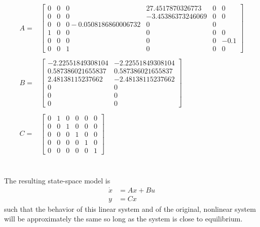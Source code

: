 \documentclass[12pt]{article}
\begin{document}
\begin{equation}
\begin{aligned}
\label{eqnJacob} 
A =& \begin{bmatrix} 
0 & 0 & 0 & 27.4517870326773 & 0 & 0 \\ 0 & 0 & 0 & -3.45386373246069 & 0 & 0 \\ 0 & 0 & 0 -0.0508186860006732 & 0 & 0 \\ 1 & 0 & 0 & 0 & 0 & 0 \\ 0 & 0 & 0 & 0 & 0 & -0.1 \\ 0 & 0 & 1 & 0 & 0 & 0
\end{bmatrix}
\\ \\
B =& 
\begin{bmatrix} 
-2.22551849308104 & -2.22551849308104 \\ 0.587386021655837 & 0.587386021655837 \\ 2.48138115237662 & -2.48138115237662 \\0 & 0 \\ 0 & 0 \\ 0 & 0

\end{bmatrix} 
\\ \\
C =&
\begin{bmatrix} 
0 & 1 & 0 & 0 & 0 & 0 \\ 0 & 0 & 1 & 0 & 0 & 0 \\ 0 & 0 & 0 & 1 & 0 & 0 \\ 0 & 0 & 0 & 0 & 1 & 0 \\ 0 &0 & 0 & 0 & 0 & 1
\end{bmatrix}
\end{aligned}
\end{equation}
\\ \\
The resulting state-space model is
\begin{align*}
\dot{x} &= Ax+Bu \\
y &= Cx
\end{align*}
such that the behavior of this linear system and of the original, nonlinear system will be approximately the same so long as the system is close to equilibrium.
\end{document}
